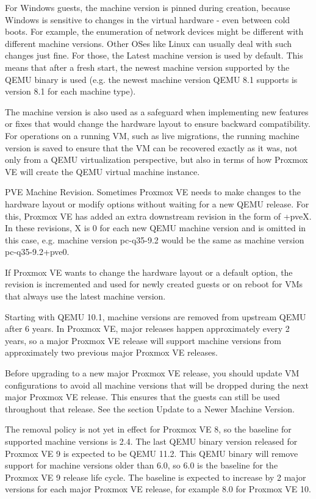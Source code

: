 For Windows guests, the machine version is pinned during creation, because Windows is sensitive to changes in the virtual hardware - even between cold boots. For example, the enumeration of network devices might be different with different machine versions. Other OSes like Linux can usually deal with such changes just fine. For those, the Latest machine version is used by default. This means that after a fresh start, the newest machine version supported by the QEMU binary is used (e.g. the newest machine version QEMU 8.1 supports is version 8.1 for each machine type).

The machine version is also used as a safeguard when implementing new features or fixes that would change the hardware layout to ensure backward compatibility. For operations on a running VM, such as live migrations, the running machine version is saved to ensure that the VM can be recovered exactly as it was, not only from a QEMU virtualization perspective, but also in terms of how Proxmox VE will create the QEMU virtual machine instance.

PVE Machine Revision. Sometimes Proxmox VE needs to make changes to the hardware layout or modify options without waiting for a new QEMU release. For this, Proxmox VE has added an extra downstream revision in the form of +pveX. In these revisions, X is 0 for each new QEMU machine version and is omitted in this case, e.g. machine version pc-q35-9.2 would be the same as machine version pc-q35-9.2+pve0.

If Proxmox VE wants to change the hardware layout or a default option, the revision is incremented and used for newly created guests or on reboot for VMs that always use the latest machine version.

Starting with QEMU 10.1, machine versions are removed from upstream QEMU after 6 years. In Proxmox VE, major releases happen approximately every 2 years, so a major Proxmox VE release will support machine versions from approximately two previous major Proxmox VE releases.

Before upgrading to a new major Proxmox VE release, you should update VM configurations to avoid all machine versions that will be dropped during the next major Proxmox VE release. This ensures that the guests can still be used throughout that release. See the section Update to a Newer Machine Version.

The removal policy is not yet in effect for Proxmox VE 8, so the baseline for supported machine versions is 2.4. The last QEMU binary version released for Proxmox VE 9 is expected to be QEMU 11.2. This QEMU binary will remove support for machine versions older than 6.0, so 6.0 is the baseline for the Proxmox VE 9 release life cycle. The baseline is expected to increase by 2 major versions for each major Proxmox VE release, for example 8.0 for Proxmox VE 10.

